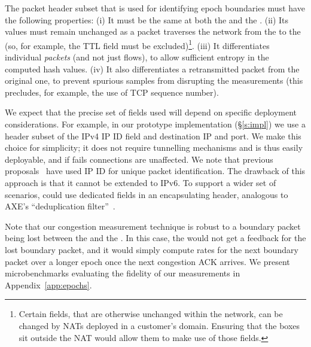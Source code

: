 The packet header subset that is used for identifying epoch boundaries must have the following properties:
(i) It must be the same at both the \inbox and the \outbox.
(ii) Its values must remain unchanged as a packet traverses the network from the \inbox to the \outbox (so, for example, the TTL field must be excluded)\footnote{Certain fields, that are otherwise unchanged within the network, can be changed by NATs deployed in a customer's domain. Ensuring that the \name boxes sit outside the NAT would allow them to make use of those fields.}.
(iii) It differentiates individual \emph{packets} (and not just flows), to allow sufficient entropy in the computed hash values.
(iv) It also differentiates a retransmitted packet from the original one, to prevent spurious samples from disrupting the measurements (this precludes, for example, the use of TCP sequence number).

We expect that the precise set of fields used will depend on specific deployment considerations.
For example, in our prototype implementation (\S\ref{s:impl}) we use a header subset of the IPv4 IP ID field and destination IP and port. 
We make this choice for simplicity; it does not require tunnelling mechanisms and is thus easily deployable, and if \name fails connections are unaffected. 
We note that previous proposals~\cite{ip-traceback} have used IP ID for unique packet identification. 
The drawback of this approach is that it cannot be extended to IPv6.
To support a wider set of scenarios, \name could use dedicated fields in an encapsulating header, analogous to AXE's ``deduplication filter''~\cite{axe}.

Note that our congestion measurement technique is robust to a boundary packet being lost between the \inbox and the \outbox. In this case, the \inbox would not get a feedback for the lost boundary packet, and it would simply compute rates for the next boundary packet over a longer epoch once the next congestion ACK arrives. We present microbenchmarks evaluating the fidelity of our measurements in Appendix~\ref{app:epochs}.


